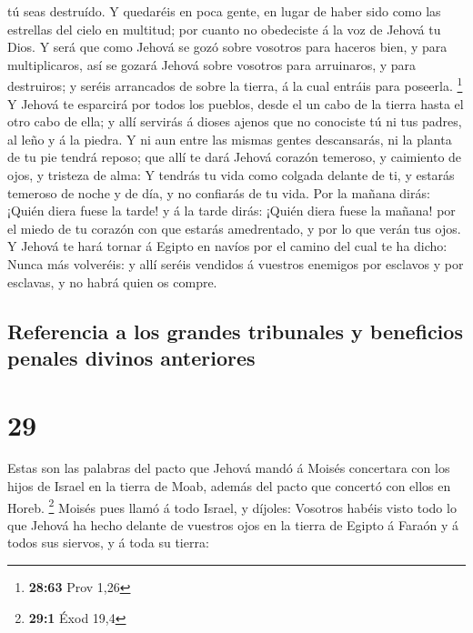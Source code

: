 tú seas destruído.  Y quedaréis en poca gente, en lugar de
haber sido como las estrellas del cielo en multitud; por cuanto no
obedeciste á la voz de Jehová tu Dios.  Y será que como
Jehová se gozó sobre vosotros para haceros bien, y para multiplicaros,
así se gozará Jehová sobre vosotros para arruinaros, y para destruiros;
y seréis arrancados de sobre la tierra, á la cual entráis para poseerla.
\footnote{\textbf{28:63} Prov 1,26}  Y Jehová te esparcirá
por todos los pueblos, desde el un cabo de la tierra hasta el otro cabo
de ella; y allí servirás á dioses ajenos que no conociste tú ni tus
padres, al leño y á la piedra.  Y ni aun entre las mismas
gentes descansarás, ni la planta de tu pie tendrá reposo; que allí te
dará Jehová corazón temeroso, y caimiento de ojos, y tristeza de alma:
 Y tendrás tu vida como colgada delante de ti, y estarás
temeroso de noche y de día, y no confiarás de tu vida.  Por
la mañana dirás: ¡Quién diera fuese la tarde! y á la tarde dirás: ¡Quién
diera fuese la mañana! por el miedo de tu corazón con que estarás
amedrentado, y por lo que verán tus ojos.  Y Jehová te hará
tornar á Egipto en navíos por el camino del cual te ha dicho: Nunca más
volveréis: y allí seréis vendidos á vuestros enemigos por esclavos y por
esclavas, y no habrá quien os compre.

\hypertarget{referencia-a-los-grandes-tribunales-y-beneficios-penales-divinos-anteriores}{%
\subsection{Referencia a los grandes tribunales y beneficios penales
divinos
anteriores}\label{referencia-a-los-grandes-tribunales-y-beneficios-penales-divinos-anteriores}}

\hypertarget{section-28}{%
\section{29}\label{section-28}}

 Estas son las palabras del pacto que Jehová mandó á Moisés
concertara con los hijos de Israel en la tierra de Moab, además del
pacto que concertó con ellos en Horeb. \footnote{\textbf{29:1} Éxod 19,4}
 Moisés pues llamó á todo Israel, y díjoles: Vosotros habéis
visto todo lo que Jehová ha hecho delante de vuestros ojos en la tierra
de Egipto á Faraón y á todos sus siervos, y á toda su tierra:

